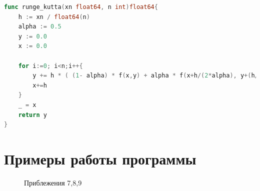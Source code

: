 \documentclass[12pt]{report}
\begin{document}
\begin{lstlisting}[label=euler,caption = Метод Рунге-Кутты, language = go]
func runge_kutta(xn float64, n int)float64{
	h := xn / float64(n)
	alpha := 0.5
	y := 0.0
	x := 0.0
	
	for i:=0; i<n;i++{
		y += h * ( (1- alpha) * f(x,y) + alpha * f(x+h/(2*alpha), y+(h/2*alpha)*f(x,y)) )
		x+=h
	}
	_ = x
	return y
}
\end{lstlisting}

\chapter{Примеры работы программы}
\begin{figure}[h]
	\caption{Приблежения 7,8,9}
	\label{fig:f_p}
\end{figure}
\end{document}

